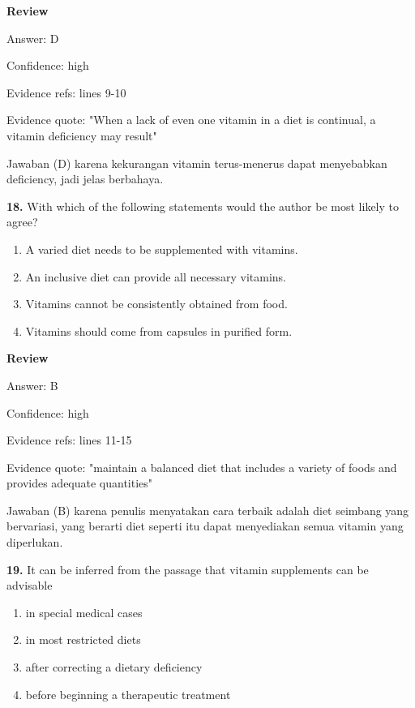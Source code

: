 \documentclass[12pt]{article}
\begin{document}
\setlength{\parindent}{0pt}
\textbf{Review}\par
Answer: D\par
Confidence: high\par
Evidence refs: lines 9-10\par
Evidence quote: "When a lack of even one vitamin in a diet is continual, a vitamin deficiency may result"\par
Jawaban (D) karena kekurangan vitamin terus-menerus dapat menyebabkan deficiency, jadi jelas berbahaya.\par
\endgroup
\par
\vspace{0.25\baselineskip}
\noindent\textbf{18.} With which of the following statements would the author be most likely to agree?
\begin{enumerate}[label=(\Alph*),leftmargin=*,itemsep=0.2em]
\item A varied diet needs to be supplemented with vitamins.
\item An inclusive diet can provide all necessary vitamins.
\item Vitamins cannot be consistently obtained from food.
\item Vitamins should come from capsules in purified form.
\end{enumerate}
\par
\begingroup
\setlength{\parskip}{0pt}
\setlength{\parindent}{0pt}
\textbf{Review}\par
Answer: B\par
Confidence: high\par
Evidence refs: lines 11-15\par
Evidence quote: "maintain a balanced diet that includes a variety of foods and provides adequate quantities"\par
Jawaban (B) karena penulis menyatakan cara terbaik adalah diet seimbang yang bervariasi, yang berarti diet seperti itu dapat menyediakan semua vitamin yang diperlukan.\par
\endgroup
\par
\vspace{0.25\baselineskip}
\noindent\textbf{19.} It can be inferred from the passage that vitamin supplements can be advisable
\begin{enumerate}[label=(\Alph*),leftmargin=*,itemsep=0.2em]
\item in special medical cases
\item in most restricted diets
\item after correcting a dietary deficiency
\item before beginning a therapeutic treatment
\end{enumerate}
\end{document}

